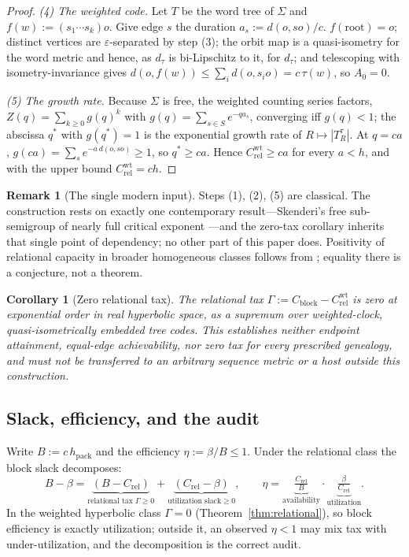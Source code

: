 \documentclass[11pt,reqno]{amsart}
\theoremstyle{plain}
\newtheorem{corollary}[theorem]{Corollary}
\theoremstyle{definition}
\newtheorem{remark}[theorem]{Remark}
\newcommand{\hpack}{h_{\mathrm{pack}}}
\newcommand{\Crel}{C_{\mathrm{rel}}}
\newcommand{\Cblock}{C_{\mathrm{block}}}
\newcommand{\eps}{\varepsilon}
\begin{document}
\begin{proof}
\emph{(4) The weighted code.} Let $T$ be the word tree of $\Sigma$ and $f(w):=(s_1\cdots s_k)o$. Give edge $s$ the duration $a_s:=d(o,so)/c$. $f(\mathrm{root})=o$; distinct vertices are $\eps$-separated by step (3); the orbit map is a quasi-isometry for the word metric and hence, as $d_\tau$ is bi-Lipschitz to it, for $d_\tau$; and telescoping with isometry-invariance gives $d(o,f(w))\le\sum_i d(o,s_io)=c\,\tau(w)$, so $A_0=0$.

\emph{(5) The growth rate.} Because $\Sigma$ is free, the weighted counting series factors, $Z(q)=\sum_{k\ge0}g(q)^k$ with $g(q)=\sum_{s\in S}e^{-qa_s}$, converging iff $g(q)<1$; the abscissa $q^*$ with $g(q^*)=1$ is the exponential growth rate of $R\mapsto|T_R^\tau|$. At $q=ca$, $g(ca)=\sum_s e^{-a\,d(o,so)}\ge1$, so $q^*\ge ca$. Hence $\Crel^{\mathrm{wt}}\ge ca$ for every $a<h$, and with the upper bound $\Crel^{\mathrm{wt}}=ch$.
\end{proof}

\begin{remark}[The single modern input]
Steps (1), (2), (5) are classical. The construction rests on exactly one contemporary result---Skenderi's free sub-semigroup of nearly full critical exponent \cite{skenderi2026}---and the zero-tax corollary inherits that single point of dependency; no other part of this paper does. Positivity of relational capacity in broader homogeneous classes follows from \cite{tessera2008,kerr2022}; equality there is a conjecture, not a theorem.
\end{remark}

\begin{corollary}[Zero relational tax]\label{cor:zerotax}
The relational tax $\Gamma:=\Cblock-\Crel^{\mathrm{wt}}$ is zero at exponential order in real hyperbolic space, as a supremum over weighted-clock, quasi-isometrically embedded tree codes. This establishes neither endpoint attainment, equal-edge achievability, nor zero tax for every prescribed genealogy, and must not be transferred to an arbitrary sequence metric or a host outside this construction.
\end{corollary}

\subsection{Slack, efficiency, and the audit}\label{sec:slack}

Write $B:=c\,\hpack$ and the efficiency $\eta:=\beta/B\le1$. Under the relational class the block slack decomposes:
\[
B-\beta=\underbrace{(B-\Crel)}_{\text{relational tax }\Gamma\ge0}+\underbrace{(\Crel-\beta)}_{\text{utilization slack}\ge0},\qquad
\eta=\underbrace{\tfrac{\Crel}{B}}_{\text{availability}}\cdot\underbrace{\tfrac{\beta}{\Crel}}_{\text{utilization}}.
\]
In the weighted hyperbolic class $\Gamma=0$ (Theorem~\ref{thm:relational}), so block efficiency is exactly utilization; outside it, an observed $\eta<1$ may mix tax with under-utilization, and the decomposition is the correct audit.
\end{document}

